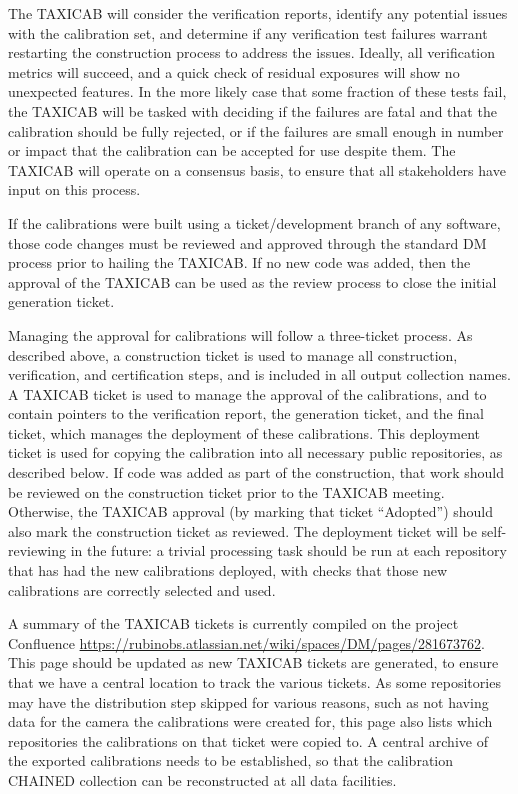 \documentclass[DM,authoryear,toc]{lsstdoc}
\begin{document}
The TAXICAB will consider the verification reports, identify any potential issues with the calibration set, and determine if any verification test failures warrant restarting the construction process to address the issues.
Ideally, all verification metrics will succeed, and a quick check of residual exposures will show no unexpected features.
In the more likely case that some fraction of these tests fail, the TAXICAB will be tasked with deciding if the failures are fatal and that the calibration should be fully rejected, or if the failures are small enough in number or impact that the calibration can be accepted for use despite them.
The TAXICAB will operate on a consensus basis, to ensure that all stakeholders have input on this process.

If the calibrations were built using a ticket/development branch of any software, those code changes must be reviewed and approved through the standard DM process prior to hailing the TAXICAB.
If no new code was added, then the approval of the TAXICAB can be used as the review process to close the initial generation ticket.

Managing the approval for calibrations will follow a three-ticket process.
As described above, a construction ticket is used to manage all construction, verification, and certification steps, and is included in all output collection names.
A TAXICAB ticket is used to manage the approval of the calibrations, and to contain pointers to the verification report, the generation ticket, and the final ticket, which manages the deployment of these calibrations.
This deployment ticket is used for copying the calibration into all necessary public repositories, as described below.
If code was added as part of the construction, that work should be reviewed on the construction ticket prior to the TAXICAB meeting.
Otherwise, the TAXICAB approval (by marking that ticket ``Adopted'') should also mark the construction ticket as reviewed.
The deployment ticket will be self-reviewing in the future: a trivial processing task should be run at each repository that has had the new calibrations deployed, with checks that those new calibrations are correctly selected and used.

A summary of the TAXICAB tickets is currently compiled on the project Confluence \url{https://rubinobs.atlassian.net/wiki/spaces/DM/pages/281673762}.
This page should be updated as new TAXICAB tickets are generated, to ensure that we have a central location to track the various tickets.
As some repositories may have the distribution step skipped for various reasons, such as not having data for the camera the calibrations were created for, this page also lists which repositories the calibrations on that ticket were copied to.
A central archive of the exported calibrations needs to be established, so that the calibration CHAINED collection can be reconstructed at all data facilities.
\end{document}
